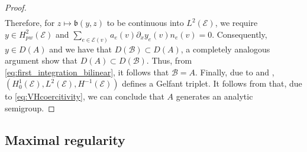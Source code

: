 \documentclass[a4paper, 10pt, english]{article}
\begin{document}
\begin{proof}
\begin{align*}
\end{align*}
Therefore, for $z\mapsto \mathfrak{b}(y,z) $ to be continuous into $L^2(\mathcal{E})$, we require $y\in H^2_{pw}(\mathcal{E})$ and $\sum_{e\in\mathcal{E}(v)}a_e(v)\partial_x y_e(v)n_e(v)=0.$ Consequently, $y\in D(A)$ and we have that $D(\mathfrak{\mathcal{B}})\subset D(A)$, a completely analogous argument show that $D(A) \subset D(\mathfrak{\mathcal{B}})$. Thus, from \eqref{eq:first_integration_bilinear}, it follows that $\mathfrak{\mathcal{B}}=A$. Finally, due to and  ,  $(H_0^1(\mathcal{E}),L^2(\mathcal{E}),H^{-1}(\mathcal{E}))$ defines a Gelfant triplet. It follows from \cite[Theorem 2.12]{Bensoussan} that, due to \eqref{eq:VHcoercitivity}, we can conclude that $A$ generates an analytic semigroup.
\end{proof}


\subsection{Maximal regularity}
\end{document}

